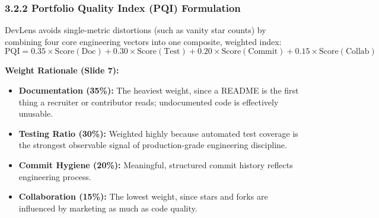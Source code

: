 \documentclass[12pt,a4paper]{article}
\begin{document}
\subsubsection{3.2.2 Portfolio Quality Index (PQI) Formulation}
DevLens avoids single-metric distortions (such as vanity star counts) by combining four core engineering vectors into one composite, weighted index:
\begin{equation}
\text{PQI} = 0.35 \times \text{Score}(\text{Doc}) + 0.30 \times \text{Score}(\text{Test}) + 0.20 \times \text{Score}(\text{Commit}) + 0.15 \times \text{Score}(\text{Collab})
\end{equation}

\noindent \textbf{Weight Rationale (Slide 7):}
\begin{itemize}
    \item \textbf{Documentation (35\%):} The heaviest weight, since a README is the first thing a recruiter or contributor reads; undocumented code is effectively unusable.
    \item \textbf{Testing Ratio (30\%):} Weighted highly because automated test coverage is the strongest observable signal of production-grade engineering discipline.
    \item \textbf{Commit Hygiene (20\%):} Meaningful, structured commit history reflects engineering process.
    \item \textbf{Collaboration (15\%):} The lowest weight, since stars and forks are influenced by marketing as much as code quality.
\end{itemize}

\newpage
\thispagestyle{fancy}
\end{document}
